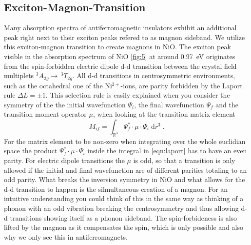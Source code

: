 \subsection{Exciton-Magnon-Transition}
Many absorption spectra of antiferromagnetic insulators exhibit an additional peak right next to their exciton peaks  refered to as magnon sideband.
We utilize this exciton-magnon transition to create magnons in NiO.
The exciton peak visible in the absorption spectrum of NiO \autoref{fig:5} at around \qty{0.97}{eV} originates from the spin-forbidden electric dipole d-d transition between the crystal field multiplets $^3A_{2g} \rightarrow \, ^3T_{2g}$.
All d-d transitions in centrosymmetric environments, such as the octahedral one of the Ni$^{2+}$-ions, are parity forbidden by the Laport rule $\Delta L = \pm 1$.
This selection rule is easily explained when you consider the symmetry of the the initial wavefunction $\Psi_i$, the final wavefunction $\Psi_f$ and the transition moment operator $\mu$, when looking at the transition matrix element
\begin{equation}
    M_{if} = \int_{\mathbb{R}^3} \Psi^*_f \cdot \mu \cdot \Psi_i \;\text{d}r^3 \;.
    \label{eqn:laport}
\end{equation}
For the matrix element to be non-zero when integrating over the whole euclidian space the product $\Psi^*_f \cdot \mu \cdot \Psi_i$ inside the integral in \autoref{eqn:laport} has to have an even parity.
For electric dipole transitions the $\mu$ is odd, so that a transition is only allowed if the initial and final wavefunction are of different parities totaling to an odd parity.
What breaks the inversion symmetry in NiO and what allows for the d-d transition to happen is the silmultaneous creation of a magnon.
For an intuitive understanding you could think of this in the same way as thinking of a phonon with an odd vibration breaking the centrosymmetry and thus allowing d-d transitions showing itself as a phonon sideband.
The spin-forbideness is also lifted by the magnon as it compensates the spin, which is only possible and also why we only see this in antiferromagnets.
